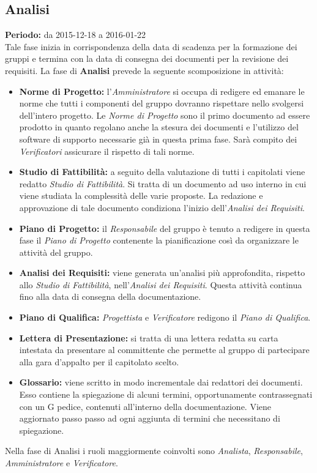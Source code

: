 \subsection{Analisi}
\textbf{Periodo:} da 2015-12-18 a 2016-01-22 \\
Tale fase inizia in corrispondenza della data di scadenza per la formazione dei gruppi e termina con la data di consegna dei documenti per la revisione dei requisiti. La fase di \textbf{Analisi} prevede la seguente scomposizione in attività:
\begin{itemize}
\item \textbf{Norme di Progetto:} l'\textit{Amministratore} si occupa di redigere ed emanare le norme che tutti i componenti del gruppo dovranno rispettare nello svolgersi dell'intero progetto. Le \textit{Norme di Progetto} sono il primo documento ad essere prodotto in quanto regolano anche la stesura dei documenti e l'utilizzo del software di supporto necessarie già in questa prima fase. Sarà compito dei \textit{Verificatori} assicurare il rispetto di tali norme.
\item \textbf{Studio di Fattibilità:} a seguito della valutazione di tutti i capitolati viene redatto \textit{Studio di Fattibilità}. Si tratta di un documento ad uso interno in cui viene studiata la complessità delle varie proposte. La redazione e approvazione di tale documento condiziona l'inizio dell'\textit{Analisi dei Requisiti}.
\item \textbf{Piano di Progetto:} il \textit{Responsabile} del gruppo è tenuto a redigere in questa fase il \textit{Piano di Progetto} contenente la pianificazione così da organizzare le attività del gruppo.
\item \textbf{Analisi dei Requisiti:} viene generata un'analisi più approfondita, rispetto allo \textit{Studio di Fattibilità}, nell'\textit{Analisi dei Requisiti}. Questa attività continua fino alla data di consegna della documentazione.
\item \textbf{Piano di Qualifica:} \textit{Progettista} e \textit{Verificatore} redigono il \textit{Piano di Qualifica}.
\item \textbf{Lettera di Presentazione:} si tratta di una lettera redatta su carta intestata da presentare al committente che permette al gruppo di partecipare alla gara d'appalto per il capitolato scelto.
\item \textbf{Glossario:} viene scritto in modo incrementale dai redattori dei documenti. Esso contiene la spiegazione di alcuni termini, opportunamente contrassegnati con un G pedice, contenuti all'interno della documentazione. Viene aggiornato passo passo ad ogni aggiunta di termini che necessitano di spiegazione.
\end{itemize}
Nella fase di Analisi i ruoli maggiormente coinvolti sono \textit{Analista}, \textit{Responsabile}, \textit{Amministratore} e \textit{Verificatore}.

